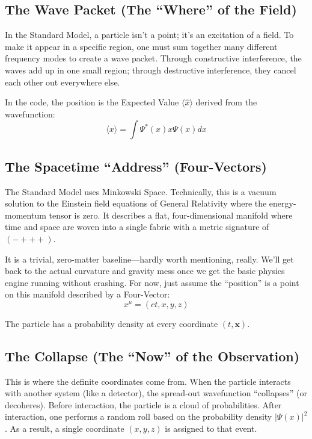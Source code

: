 \subsection*{The Wave Packet (The ``Where'' of the Field)}

In the Standard Model, a particle isn't a point; it's an excitation of a field. To make it appear in a specific region, one must sum together many different frequency modes to create a wave packet. Through constructive interference, the waves add up in one small region; through destructive interference, they cancel each other out everywhere else.

In the code, the position is the Expected Value $\langle \hat{x} \rangle$ derived from the wavefunction:
$$ \langle x \rangle = \int \Psi^*(x) x \Psi(x) dx $$



\subsection*{The Spacetime ``Address'' (Four-Vectors)}

The Standard Model uses Minkowski Space. Technically, this is a vacuum solution to the Einstein field equations of General Relativity where the energy-momentum tensor is zero. It describes a flat, four-dimensional manifold where time and space are woven into a single fabric with a metric signature of $(-+++)$. 

It is a trivial, zero-matter baseline—hardly worth mentioning, really. We'll get back to the actual curvature and gravity mess once we get the basic physics engine running without crashing. For now, just assume the ``position'' is a point on this manifold described by a Four-Vector:
\[
x^\mu = (ct, x, y, z)
\]

The particle has a probability density at every coordinate $(t, \mathbf{x})$.

\subsection{The Collapse (The ``Now'' of the Observation)}

This is where the definite coordinates come from. When the particle interacts with another system (like a detector), the spread-out wavefunction ``collapses'' (or decoheres). Before interaction, the particle is a cloud of probabilities. After interaction, one performs a random roll based on the probability density $|\Psi(x)|^2$. As a result, a single coordinate $(x, y, z)$ is assigned to that event.

